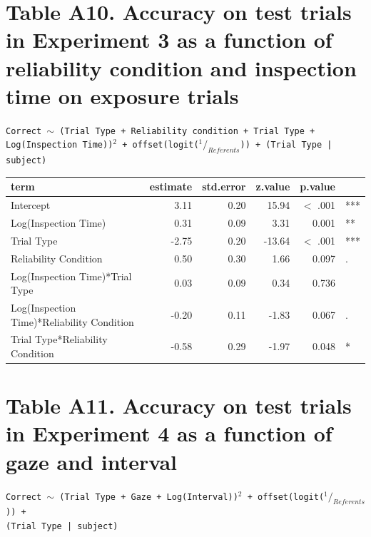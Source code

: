 \documentclass[authoryear, review]{elsarticle}
\begin{document}
\section*{Table A10. Accuracy on test trials in Experiment 3 as a function of reliability condition and inspection time on exposure trials}

\texttt{Correct $\sim$ (Trial Type + Reliability condition + Trial Type + \\ Log(Inspection Time))$^2$ + offset(logit($^1/_{Referents}$)) + (Trial Type | subject)}

\begin{table}[h]
\centering
\begin{tabular}{lrrrrl}
 term & estimate & std.error & z.value & p.value &  \\ 
  \hline
Intercept & 3.11 & 0.20 & 15.94 & $<$ .001 & *** \\ 
  Log(Inspection Time) & 0.31 & 0.09 & 3.31 & 0.001 & ** \\ 
  Trial Type & -2.75 & 0.20 & -13.64 & $<$ .001 & *** \\ 
  Reliability Condition & 0.50 & 0.30 & 1.66 & 0.097 & . \\ 
  Log(Inspection Time)*Trial Type & 0.03 & 0.09 & 0.34 & 0.736 &  \\ 
  Log(Inspection Time)*Reliability Condition & -0.20 & 0.11 & -1.83 & 0.067 & . \\ 
  Trial Type*Reliability Condition & -0.58 & 0.29 & -1.97 & 0.048 & * \\ 
   \hline
\end{tabular}
\label{tab:e3_acc_inspect}
\end{table}

\newpage

\section*{Table A11. Accuracy on test trials in Experiment 4 as a function of gaze and interval}

\texttt{Correct $\sim$ (Trial Type + Gaze + Log(Interval))$^2$ + offset(logit($^1/_{Referents}$)) + \\ (Trial Type | subject)}
\end{document}
